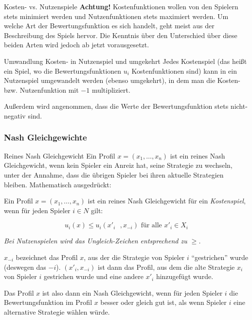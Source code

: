 \documentclass{panikzettel}
\begin{document}
{\begin{defi}{Kosten- vs. Nutzenspiele}
	\textbf{\color{red} Achtung!} Kostenfunktionen wollen von den Spielern stets minimiert werden und Nutzenfunktionen stets maximiert werden. Um welche Art der Bewertungsfunktion es sich handelt, geht meist aus der Beschreibung des Spiels hervor. Die Kenntnis über den Unterschied über diese beiden Arten wird jedoch ab jetzt vorausgesetzt.
\end{defi}

\begin{theo}{Umwandlung Kosten- in Nutzenspiel und umgekehrt}
	Jedes Kostenspiel (das heißt ein Spiel, wo die Bewertungsfunktionen $u_i$ Kostenfunktionen sind) kann in ein Nutzenspiel umgewandelt werden (ebenso umgekehrt), in dem man die Kosten- bzw. Nutzenfunktion mit $-1$ multipliziert.
	
	Außerdem wird angenommen, dass die Werte der Bewertungsfunktion stets nicht-negativ sind.
\end{theo}

\subsubsection{Nash Gleichgewichte}

\begin{defi}{Reines Nash Gleichgewicht}
	Ein Profil $x = (x_1, \dots, x_n)$ ist ein reines Nash Gleichgewicht, wenn kein Spieler ein Anreiz hat, seine Strategie zu wechseln, unter der Annahme, dass die übrigen Spieler bei ihren aktuelle Strategien bleiben. Mathematisch ausgedrückt:
	
	Ein Profil $x = (x_1, \dots, x_n)$ ist ein reines Nash Gleichgewicht für ein \emph{Kostenspiel}, wenn für jeden Spieler $i \in N$ gilt:


		\[ u_i(x) \leq u_i(x'_i \text{ }, x_{-i}) \text{ für alle } x'_i \in X_i \] 

\textit{Bei Nutzenspielen wird das Ungleich-Zeichen entsprechend zu $\geq$.}
	
	$x_{-i}$ bezeichnet das Profil $x$, aus der die Strategie von Spieler $i$ ``gestrichen'' wurde (deswegen das $-i$). $(x'_i, x_{-i})$ ist dann das Profil, aus dem die alte Strategie $x_i$ von Spieler $i$ gestrichen wurde und eine andere $x'_i$ hinzugefügt wurde. 
	
	Das Profil $x$ ist also dann ein Nash Gleichgewicht, wenn für jeden Spieler $i$ die Bewertungsfunktion im Profil $x$ besser oder gleich gut ist, als wenn Spieler $i$ eine alternative Strategie wählen würde.
\end{defi}

}
\end{document}
